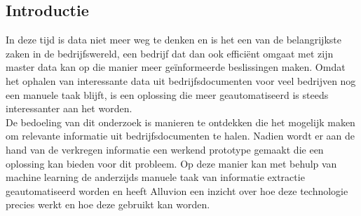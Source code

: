 \documentclass[a0,portrait]{hogent-poster}
\begin{document}
\begin{multicols}{2} %

\section{Introductie}
In deze tijd is data niet meer weg te denken en is het een van de belangrijkste zaken in de bedrijfswereld, een bedrijf dat dan ook efficiënt omgaat met zijn master data kan op die manier meer geïnformeerde beslissingen maken. Omdat het ophalen van interessante data uit bedrijfsdocumenten voor veel bedrijven nog een manuele taak blijft, is een oplossing die meer geautomatiseerd is steeds interessanter aan het worden. 
\\
De bedoeling van dit onderzoek is manieren te ontdekken die het mogelijk maken om relevante informatie uit bedrijfsdocumenten te halen. Nadien wordt er aan de hand van de verkregen informatie een werkend prototype gemaakt die een oplossing kan bieden voor dit probleem. Op deze manier kan met behulp van machine learning de anderzijds manuele taak van informatie extractie geautomatiseerd worden en heeft Alluvion een inzicht over hoe deze technologie precies werkt en hoe deze gebruikt kan worden.


\end{multicols}
\end{document}
